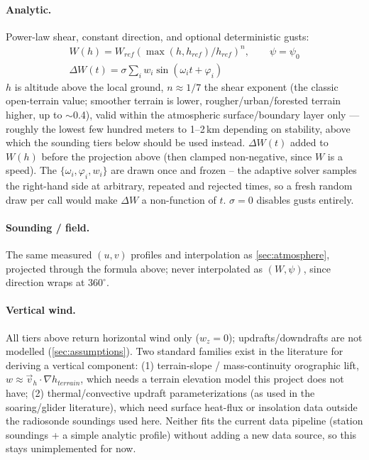 {\paragraph{Analytic.} Power-law shear, constant direction, and optional deterministic gusts:
\begin{gather}
    W(h) = W_{ref}\left(\max(h,h_{ref})/h_{ref}\right)^{n}, \qquad \psi = \psi_0 \\
    \Delta W(t) = \sigma\sum_i w_i\sin(\omega_it+\varphi_i)
\end{gather}
$h$ is altitude above the local ground, $n\approx1/7$ the shear exponent (the classic open-terrain
value; smoother terrain is lower, rougher/urban/forested terrain higher, up to $\sim$0.4), valid
within the atmospheric surface/boundary layer only --- roughly the lowest few hundred meters to
1--2\,km depending on stability, above which the sounding tiers below should be used instead.
$\Delta W(t)$ added to $W(h)$ before the projection above (then clamped non-negative, since $W$
is a speed). The $\{\omega_i,\varphi_i,w_i\}$ are drawn once and frozen -- the adaptive solver
samples the right-hand side at arbitrary, repeated and rejected times, so a fresh random draw per
call would make $\Delta W$ a non-function of $t$. $\sigma=0$ disables gusts entirely.

\paragraph{Sounding / field.} The same measured $(u,v)$ profiles and interpolation as
\autoref{sec:atmosphere}, projected through the formula above; never interpolated as $(W,\psi)$,
since direction wraps at $360^\circ$.

\paragraph{Vertical wind.} All tiers above return horizontal wind only ($w_z = 0$);
updrafts/downdrafts are not modelled (\autoref{sec:assumptions}). Two standard families exist in the
literature for deriving a vertical component: (1) terrain-slope / mass-continuity orographic lift,
$w \approx \vec{v}_h\cdot\nabla h_{terrain}$, which needs a terrain elevation model this project
does not have; (2) thermal/convective updraft parameterizations (as used in the soaring/glider
literature), which need surface heat-flux or insolation data outside the radiosonde soundings used
here. Neither fits the current data pipeline (station soundings + a simple analytic profile)
without adding a new data source, so this stays unimplemented for now.
}


